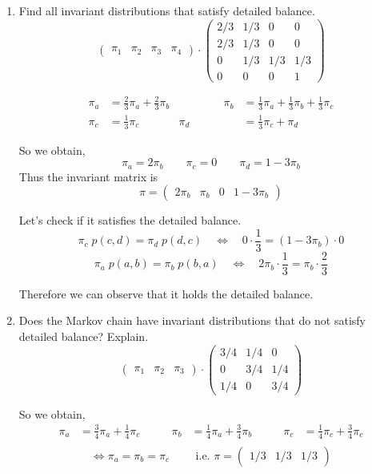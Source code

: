 \documentclass[12pt]{article}
\begin{document}
\begin{enumerate}[label=(\alph*)]
    \item Find all invariant distributions that satisfy detailed balance.
    $$
    \begin{pmatrix}
    \pi_1&\pi_2&\pi_3&\pi_4
    \end{pmatrix}
    \cdot
    \begin{pmatrix}
    2/3&1/3&0&0\\
    2/3&1/3&0&0\\
    0&1/3&1/3&1/3\\
    0&0&0&1
    \end{pmatrix}
    $$
    
\begin{align*}
    \pi_a &= \frac{2}{3}\pi_a + \frac{2}{3}\pi_b     & \qquad\qquad
    \pi_b &= \frac{1}{3}\pi_a + \frac{1}{3}\pi_b + \frac{1}{3}\pi_c\\
    \pi_c &= \frac{1}{3}\pi_c    &   
    \pi_d &= \frac{1}{3}\pi_c+\pi_d
\end{align*}

So we obtain, $$\pi_a = 2\pi_b \qquad \pi_c=0 \qquad\pi_d=1-3\pi_b$$
Thus the invariant matrix is
$$\pi=
\begin{pmatrix}
2\pi_b&\pi_b&0&1-3\pi_b
\end{pmatrix}$$

Let's check if it satisfies the detailed balance.
$$\pi_c\; p(c,d) = \pi_d\; p(d,c)\quad \Leftrightarrow\quad 0\cdot \frac{1}{3} = (1-3\pi_b)\cdot 0$$
$$\pi_a\; p(a,b) = \pi_b\; p(b,a)\quad \Leftrightarrow\quad 2\pi_b\cdot \frac{1}{3} = \pi_b\cdot \frac{2}{3}$$

\vspace{1.5\baselineskip}
Therefore we can observe that it holds the detailed balance.

\newpage
    \item Does the Markov chain have invariant distributions that do not satisfy detailed balance? Explain.
    $$
    \begin{pmatrix}
    \pi_1&\pi_2&\pi_3
    \end{pmatrix}
    \cdot
    \begin{pmatrix}
    3/4&1/4&0\\0&3/4&1/4\\1/4&0&3/4
    \end{pmatrix}$$

So we obtain,
\begin{align*}
    \pi_a &= \frac{3}{4}\pi_a + \frac{1}{4}\pi_c     & \qquad
    \pi_b &= \frac{1}{4}\pi_a + \frac{3}{4}\pi_b     & \qquad
    \pi_c &= \frac{1}{4}\pi_c + \frac{3}{4}\pi_c \\
\end{align*}
$$\Leftrightarrow \pi_a=\pi_b=\pi_c \qquad
\text{ i.e. } \pi = \begin{pmatrix} 1/3&1/3&1/3 \end{pmatrix}$$
   

\end{enumerate}
\end{document}
